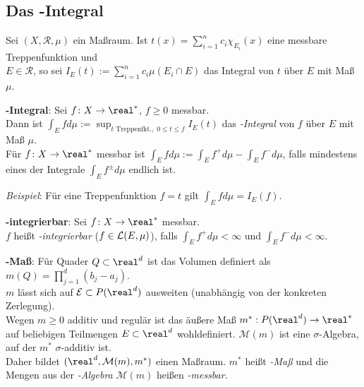 \pagebreak

\subsection{%
    Das -Integral%
}

Sei $(X, \mathcal{R}, \mu)$ ein Maßraum.
Ist $t(x) = \sum_{i=1}^n c_i \chi_{E_i}(x)$ eine messbare Treppenfunktion
und \\
$E \in \mathcal{R}$, so sei $I_E(t) := \sum_{i=1}^n c_i \mu(E_i \cap E)$
das Integral von $t$ über $E$ mit Maß $\mu$.

\textbf{-Integral}:
Sei $f\colon X \rightarrow \real^\ast$, $f \ge 0$ messbar. \\
Dann ist
$\int_E f d\mu := \sup_{t \text{ Treppenfkt.},\; 0 \le t \le f} I_E(t)$
das \emph{-Integral} von $f$ über $E$ mit Maß $\mu$. \\
Für $f\colon X \rightarrow \real^\ast$ messbar ist
$\int_E f d\mu := \int_E f^+ d\mu - \int_E f^- d\mu$, falls mindestens eines
der Integrale $\int_E f^\pm d\mu$ endlich ist.

\emph{Beispiel}: Für eine Treppenfunktion $f = t$ gilt
$\int_E f d\mu = I_E(f)$.

\textbf{-integrierbar}:
Sei $f\colon X \rightarrow \real^\ast$ messbar. \\
$f$ heißt \emph{-integrierbar} ($f \in \mathcal{L}(E, \mu)$), falls
$\int_E f^+ d\mu < \infty$ und $\int_E f^- d\mu < \infty$.

\linie

\textbf{-Maß}:
Für Quader $Q \subset \real^d$ ist das Volumen definiert als
$m(Q) = \prod_{j=1}^d (b_j - a_j)$. \\
$m$ lässt sich auf $\mathcal{E} \subset P(\real^d)$ ausweiten
(unabhängig von der konkreten Zerlegung). \\
Wegen $m \ge 0$ additiv und regulär ist das äußere Maß
$m^\ast: P(\real^d) \rightarrow \real^\ast$ auf
beliebigen Teil\-mengen $E \subset \real^d$ wohldefiniert.
$\mathcal{M}(m)$ ist eine $\sigma$-Algebra, auf der $m^\ast$ $\sigma$-additiv
ist. \\
Daher bildet $(\real^d, \mathcal{M}(m), m^\ast)$ einen Maßraum.
$m^\ast$ heißt \emph{-Maß} und die Mengen aus
der \emph{-Algebra} $\mathcal{M}(m)$
heißen \emph{-messbar}.

\linie

